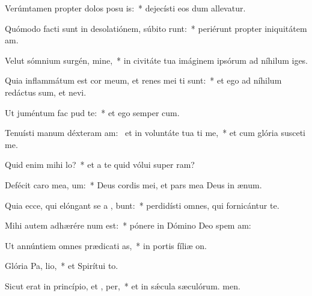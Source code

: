 \item Verúmtamen propter dolos posu is:~* dejecísti eos dum allevatur.
\item Quómodo facti sunt in desolatiónem, súbito runt:~* periérunt propter iniquitátem am.
\item Velut sómnium surgén, mine,~* in civitáte tua imáginem ipsórum ad níhilum iges.
\item Quia inflammátum est cor meum, et renes mei ti sunt:~* et ego ad níhilum redáctus sum, et nevi.
\item Ut juméntum fac  pud te:~* et ego semper cum.
\item Tenuísti manum déxteram am:~\pscross{} et in voluntáte tua ti me,~* et cum glória susceti me.
\item Quid enim mihi   lo?~* et a te quid vólui super ram?
\item Defécit caro mea,   um:~* Deus cordis mei, et pars mea Deus in ænum.
\item Quia ecce, qui elóngant se a , bunt:~* perdidísti omnes, qui fornicántur  te.
\item Mihi autem adhærére  num est:~* pónere in Dómino Deo spem am:
\item Ut annúntiem omnes prædicati as,~* in portis fíliæ on.
\item Glória Pa,  lio,~* et Spirítui to.
\item Sicut erat in princípio, et ,  per,~* et in sǽcula sæculórum. men.
